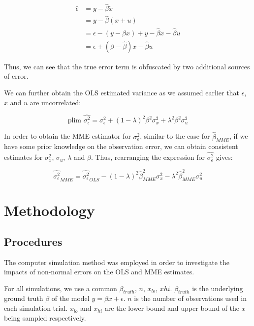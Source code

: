 \documentclass{article}
\begin{document}
\begin{equation}
    \begin{split}
        \hat{\epsilon}  &= y - \hat{\beta} \tilde{x} \\
                        &= y - \hat{\beta}(x+u) \\
                        &= \epsilon - (y - \beta x) + y - \hat{\beta}x - \hat{\beta}u \\
                        &= \epsilon + (\beta - \hat{\beta})x - \hat{\beta}u
    \end{split} 
\end{equation}

Thus, we can see that the true error term is obfuscated by two additional sources of error. 

We can further obtain the OLS estimated variance as we assumed earlier that $\epsilon$, $x$ and $u$ are uncorrelated:

\[
    \textrm{plim } \hat{\sigma^2_\epsilon} = \sigma_\epsilon^2 + (1-\lambda)^2 \beta^2 \sigma_x^2 + \lambda^2 \beta^2 \sigma_u^2   
\]

In order to obtain the MME estimator for $\sigma^2_\epsilon$, similar to the case for $\hat{\beta}_{MME}$, if we have some prior knowledge on the observation error, we can obtain consistent estimates for $\sigma_x^2$, $\sigma_u$, $\lambda$ and $\beta$. Thus, rearranging the expression for $\hat{\sigma^2_\epsilon}$ gives:

\[
    \hat{\sigma_\epsilon^2}_{MME} = \hat{\sigma^2_\epsilon}_{OLS} -  (1-\lambda)^2 \hat{\beta}_{MME}^2 \sigma_x^2 - \lambda^2 \hat{\beta}_{MME}^2 \sigma_u^2   
\]

\section{Methodology}

\subsection{Procedures}

The computer simulation method was employed in order to investigate the impacts of non-normal errors on the OLS and MME estimates.

For all simulations, we use a common $\beta_{truth}$, $n$, $x_{lo}$, $x{hi}$. $\beta_{truth}$ is the underlying ground truth $\beta$ of the model $y=\beta x + \epsilon$. $n$ is the number of observations used in each simulation trial. $x_{lo}$ and $x_{hi}$ are the lower bound and upper bound of the $x$ being sampled respectively.
\end{document}
